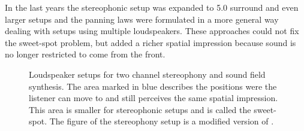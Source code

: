 In the last years the stereophonic setup was expanded to 5.0 surround
and even larger setups and the panning laws were
formulated in a more general way dealing with setups using multiple
loudspeakers.
These approaches could not fix the sweet-spot problem, but added a richer
spatial impression because sound is no longer restricted to come from the front.
%
\begin{figure}[t]
    \centering
    \small
    \caption{Loudspeaker setups for two channel stereophony
    and sound field synthesis. The area marked in blue describes the positions were the
    listener can move to and still perceives the same spatial impression. This
    area is smaller for stereophonic setups and is called the
    sweet-spot. The figure of the stereophony setup is a modified version of
    \cite[][Fig.\,1.1]{Ahrens2012}.
    }
    \label{fig:stereophony}
\end{figure}


